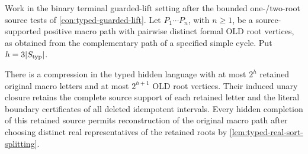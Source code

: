 \begin{lemma}
\label{lem:typed-factor-path}
Work in the binary terminal guarded-lift setting after the bounded
one-/two-root source tests of \cref{con:typed-guarded-lift}.
Let \(P_1\cdots P_n\), with \(n\ge1\), be a source-supported positive
macro path with pairwise distinct formal OLD root vertices, as obtained from the
complementary path of a specified simple cycle. Put
\(h=3|S_{\rm typ}|\).

There is a compression in the typed hidden language with at most \(2^h\) retained original macro letters
and at most \(2^{h+1}\) OLD root vertices. Their induced unary closure
retains the complete source support of each retained letter and the
literal boundary certificates of all deleted idempotent intervals.
Every hidden completion of this retained source permits reconstruction
of the original macro path after choosing distinct real representatives
of the retained roots by \cref{lem:typed-real-sort-splitting}.
\end{lemma}

